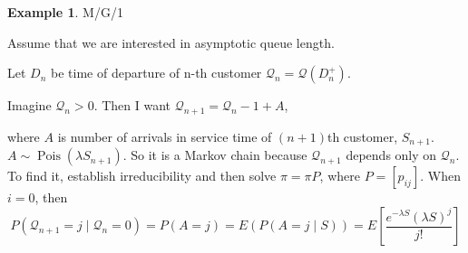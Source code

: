 \documentclass{article}
\theoremstyle{definition}
\newtheorem{exmp}{Example}[section]
\begin{document}
\begin{exmp}{M/G/1}

Assume that we are interested in asymptotic queue length.

Let $D_n$ be time of departure of n-th customer 
$\mathcal{Q}_n = \mathcal{Q} \left( D_n^+ \right)$. 

Imagine $\mathcal{Q}_n > 0$. Then I want $\mathcal{Q}_{n+1} = \mathcal{Q}_n - 1 + A$,

where $A$ is number of arrivals in service time of $(n+1)$th customer, $S_{n+1}$. $A \sim \operatorname{Pois}(\lambda S_{n+1})$.
So it is a Markov chain because $\mathcal{Q}_{n+1}$ depends only on $\mathcal{Q}_{n}$.
To find it, establish irreducibility and then solve $\pi = \pi P$,
where $P = [p_{ij}]$.
When $i=0$, then
$$
P(\mathcal{Q}_{n+1} = j \mid \mathcal{Q}_{n} = 0) = P(A=j) = E(P(A = j \mid S) ) = E \left[ \frac{e^{-\lambda S} (\lambda S)^j}{j!} \right]
$$
\end{exmp}
\end{document}
